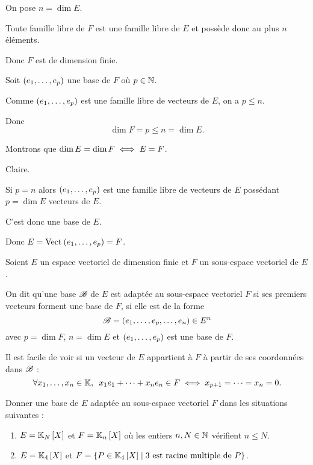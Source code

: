 \begin{dem}
On pose \(n=\dim E\).

Toute famille libre de \(F\) est une famille libre de \(E\) et possède donc au plus \(n\) éléments.

Donc \(F\) est de dimension finie.

Soit \(\left(e_1,\dots,e_p\right)\) une base de \(F\) où \(p\in\mathbb{N}\).

Comme \(\left(e_1,\dots,e_p\right)\) est une famille libre de vecteurs de \(E\), on a \(p\leq n\).

Donc \[\dim F=p\leq n=\dim E.\]

Montrons que \(\dim E=\dim F\iff E=F\).

\imprec Claire.

\impdir

Si \(p=n\) alors \(\left(e_1,\dots,e_p\right)\) est une famille libre de vecteurs de \(E\) possédant \(p=\dim E\) vecteurs de \(E\).

C'est donc une base de \(E\).

Donc \(E=\Vect{e_1,\dots,e_p}=F\).
\end{dem}

\begin{defi}
Soient \(E\) un espace vectoriel de dimension finie et \(F\) un sous-espace vectoriel de \(E\).

On dit qu'une base \(\mathscr{B}\) de \(E\) est adaptée au sous-espace vectoriel \(F\) si ses premiers vecteurs forment une base de \(F\), \cad si elle est de la forme \[\mathscr{B}=\left(e_1,\dots,e_p,\dots,e_n\right)\in E^n\] avec \(p=\dim F\), \(n=\dim E\) et \(\left(e_1,\dots,e_p\right)\) est une base de \(F\).

Il est facile de voir si un vecteur de \(E\) appartient à \(F\) à partir de ses coordonnées dans \(\mathscr{B}\) : \[\quantifs{\forall x_1,\dots,x_n\in\K}x_1e_1+\dots+x_ne_n\in F\ssi x_{p+1}=\dots=x_n=0.\]
\end{defi}

\begin{exoex}
Donner une base de \(E\) adaptée au sous-espace vectoriel \(F\) dans les situations suivantes :

\begin{enumerate}
\item \(E=\polydeg{N}\) et \(F=\polydeg{n}\) où les entiers \(n,N\in\mathbb{N}\) vérifient \(n\leq N\). \\

\item \(E=\polydeg{4}\) et \(F=\accol{P\in\polydeg{4}\tq3\text{ est racine multiple de }P}\).
\end{enumerate}
\end{exoex}

